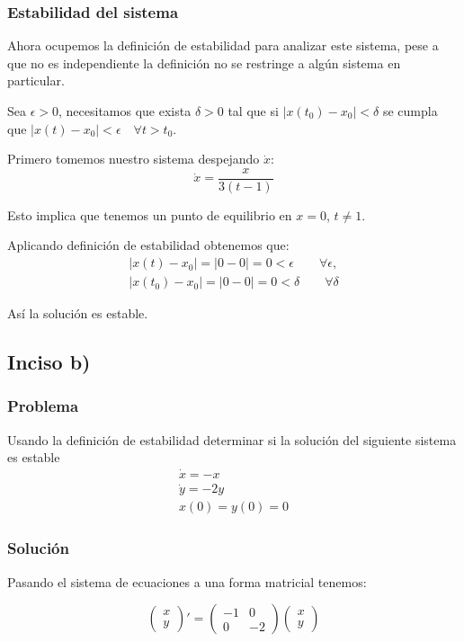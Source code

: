 \documentclass[10pt,letterpaper,titlepage]{article}
\begin{document}
\subsubsection{Estabilidad del sistema}

Ahora ocupemos la definición de estabilidad para analizar este sistema, pese a que no es independiente la definición no se restringe a algún sistema en particular.

Sea $\epsilon>0$, necesitamos que exista $\delta>0$ tal que si $|x(t_0)-x_0|<\delta$ se cumpla que $|x(t)-x_0|<\epsilon\quad\forall t>t_0$.

Primero tomemos nuestro sistema despejando $\dot{x}$:
\[
	\dot{x} = \frac{x}{3(t-1)}
\]

Esto implica que tenemos un punto de equilibrio en $x=0$, $t \ne 1$.

Aplicando definición de estabilidad obtenemos que:
\[
	\begin{array}{c}
		|x(t)-x_0| = |0-0| = 0 < \epsilon \qquad \forall \epsilon,\\
		|x(t_0)-x_0| = |0-0| = 0 < \delta \qquad \forall \delta	
	\end{array}
\]

Así la solución es estable.

\subsection{Inciso b)}

\subsubsection{Problema}
Usando la definición de estabilidad determinar si la solución del siguiente sistema es estable
\[
	\begin{array}{c}
		\dot{x} = -x\\
		\dot{y} = -2y\\
		x(0) = y(0) = 0
	\end{array}
\]

\subsubsection{Solución}

Pasando el sistema de ecuaciones a una forma matricial tenemos:

\[
	\left(\begin{matrix}
		x\\
		y
	\end{matrix}\right)' =
	\left(\begin{matrix}
		-1 & 0 \\
		0 & -2
	\end{matrix}\right)
	\left(\begin{matrix}
		x \\
		y
	\end{matrix}\right)
\]
\end{document}
